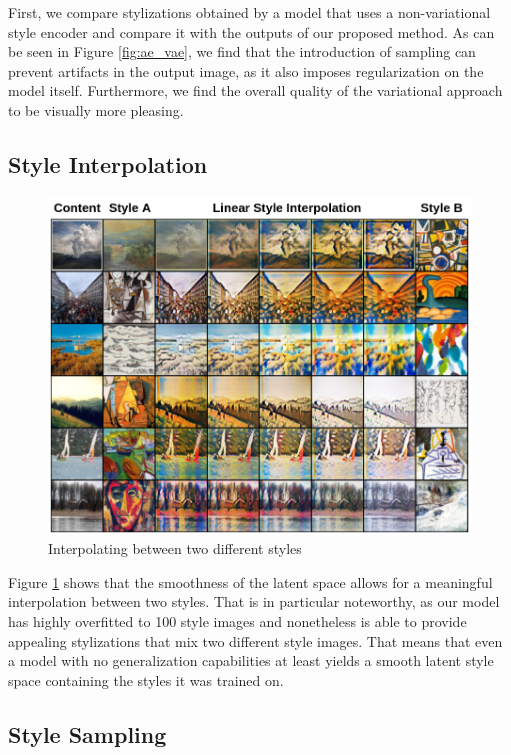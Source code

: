 \documentclass[10pt,twocolumn,letterpaper]{article}
\begin{document}
First, we compare stylizations obtained by a model that uses a non-variational style encoder and compare it with the outputs of our proposed method. As can be seen in Figure \ref{fig:ae_vae}, we find that the introduction of sampling can prevent artifacts in the output image, as it also imposes regularization on the model itself. Furthermore, we find the overall quality of the variational approach to be visually more pleasing.

\subsection{Style Interpolation}

\begin{figure}
\centering
\includegraphics[width=0.9\linewidth]{interpolation.png}
\caption{Interpolating between two different styles}
\label{fig:interpolation}
\end{figure}

Figure \ref{fig:interpolation} shows that the smoothness of the latent space allows for a meaningful interpolation between two styles. That is in particular noteworthy, as our model has highly overfitted to 100 style images and nonetheless is able to provide appealing stylizations that mix two different style images. That means that even a model with no generalization capabilities at least yields a smooth latent style space containing the styles it was trained on.

\subsection{Style Sampling}
\end{document}
